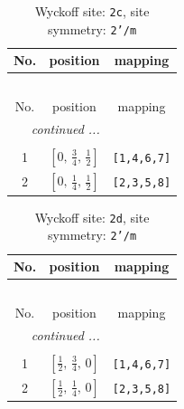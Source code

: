 \documentclass[fleqn,8pt]{jsarticle}
\begin{document}
\begin{longtable}{ccc}
\caption{Wyckoff site: {\tt 2c}, site symmetry: {\tt 2'/m}}
 \\
 \hline \hline
No. & position & mapping \\ \hline \endfirsthead

\multicolumn{2}{l}{\tablename\ \thetable{}} \\
 \hline \hline
No. & position & mapping \\ \hline \endhead

 \hline \hline
\multicolumn{2}{r}{\footnotesize\it continued ...} \\ \endfoot

 \hline \hline
\multicolumn{2}{r}{} \\ \endlastfoot

1 & $\left[ 0,\, \frac{3}{4},\, \frac{1}{2} \right]$ & {\tt [1,4,6,7]} \\ \hline
2 & $\left[ 0,\, \frac{1}{4},\, \frac{1}{2} \right]$ & {\tt [2,3,5,8]} \\
\end{longtable}
\renewcommand{\arraystretch}{1.2}
\begin{longtable}{ccc}
\caption{Wyckoff site: {\tt 2d}, site symmetry: {\tt 2'/m}}
 \\
 \hline \hline
No. & position & mapping \\ \hline \endfirsthead

\multicolumn{2}{l}{\tablename\ \thetable{}} \\
 \hline \hline
No. & position & mapping \\ \hline \endhead

 \hline \hline
\multicolumn{2}{r}{\footnotesize\it continued ...} \\ \endfoot

 \hline \hline
\multicolumn{2}{r}{} \\ \endlastfoot

1 & $\left[ \frac{1}{2},\, \frac{3}{4},\, 0 \right]$ & {\tt [1,4,6,7]} \\ \hline
2 & $\left[ \frac{1}{2},\, \frac{1}{4},\, 0 \right]$ & {\tt [2,3,5,8]} \\
\end{longtable}
\renewcommand{\arraystretch}{1.2}
\end{document}

